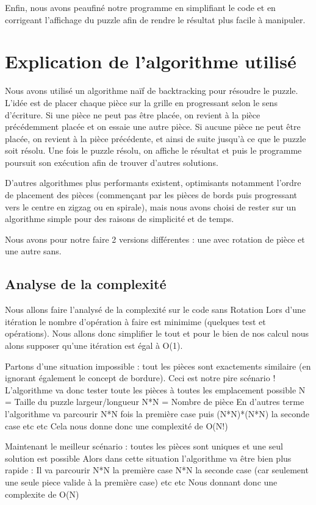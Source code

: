 \documentclass[french]{rapport}
\begin{document}
Enfin, nous avons peaufiné notre programme en simplifiant le code
et en corrigeant l'affichage du puzzle afin de rendre le résultat
plus facile à manipuler.

\section{Explication de l'algorithme utilisé}

Nous avons utilisé un algorithme naïf de backtracking pour résoudre
le puzzle. L’idée est de placer chaque pièce sur la grille en
progressant selon le sens d’écriture. Si une pièce ne peut pas être
placée, on revient à la pièce précédemment placée et on essaie une
autre pièce. Si aucune pièce ne peut être placée, on revient à la
pièce précédente, et ainsi de suite jusqu’à ce que le puzzle soit
résolu. Une fois le puzzle résolu, on affiche le résultat et puis
le programme poursuit son exécution afin de trouver d'autres
solutions. 

D'autres algorithmes plus performants existent, optimisants notamment
l'ordre de placement des pièces (commençant par les pièces de bords
puis progressant vers le centre en zigzag ou en spirale), mais nous
avons choisi de rester sur un algorithme simple pour des raisons de
simplicité et de temps.

Nous avons pour notre faire 2 versions différentes : une avec rotation de pièce et une autre sans.

\subsection{Analyse de la complexité}

Nous allons faire l'analysé de la complexité sur le code sans Rotation 
Lors d'une itération le nombre d'opération à faire est minimime (quelques test et opérations).
Nous allons donc simplifier le tout et pour le bien de nos calcul nous alons supposer qu'une itération est égal à O(1).

Partons d'une situation impossible : tout les pièces sont exactements similaire (en ignorant également le concept de bordure).
Ceci est notre pire scénario !
L'algorithme va donc tester toute les pièces à toutes les emplacement possible
N = Taille du puzzle largeur/longueur
N*N = Nombre de pièce
En d'autres terme l'algorithme va parcourir N*N fois la première case puis (N*N)*(N*N) la seconde case etc etc
Cela nous donne donc une complexité de O(N!)

Maintenant le meilleur scénario : toutes les pièces sont uniques et une seul solution est possible
Alors dans cette situation l'algorithme va être bien plus rapide :
Il va parcourir N*N la première case N*N la seconde case (car seulement une seule piece valide à la première case) etc etc
Nous donnant donc une complexite de O(N)
\end{document}
